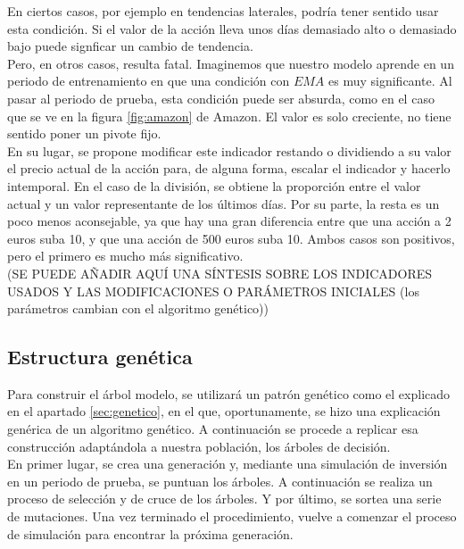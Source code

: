 En ciertos casos, por ejemplo en tendencias laterales, podr\'ia tener sentido usar esta condici\'on. Si el valor de la acci\'on lleva unos d\'ias demasiado alto o demasiado bajo puede signficar un cambio de tendencia.\\

Pero, en otros casos, resulta fatal. Imaginemos que nuestro modelo aprende en un periodo de entrenamiento en que una condici\'on con $EMA$ es muy significante. Al pasar al periodo de prueba, esta condici\'on puede ser absurda, como en el caso que se ve en la figura \ref{fig:amazon} de Amazon. El valor es solo creciente, no tiene sentido poner un pivote fijo.\\

En su lugar, se propone modificar este indicador restando o dividiendo a su valor el precio actual de la acci\'on para, de alguna forma, escalar el indicador y hacerlo intemporal. En el caso de la divisi\'on, se obtiene la proporci\'on entre el valor actual y un valor representante de los \'ultimos d\'ias. Por su parte, la resta es un poco menos aconsejable, ya que hay una gran diferencia entre que una acci\'on a 2 euros suba 10, y que una acci\'on de 500 euros suba 10. Ambos casos son positivos, pero el primero es mucho m\'as significativo. \\



(SE PUEDE A\~NADIR AQU\'I UNA S\'INTESIS SOBRE LOS INDICADORES USADOS Y LAS MODIFICACIONES O PAR\'AMETROS INICIALES (los par\'ametros cambian con el algoritmo genético))

\subsection{Estructura gen\'etica}
Para construir el \'arbol modelo, se utilizar\'a un patr\'on gen\'etico como el explicado en el apartado \ref{sec:genetico}, en el que, oportunamente, se hizo una explicaci\'on gen\'erica de un algoritmo gen\'etico. A continuaci\'on se procede a replicar esa construcci\'on adapt\'andola a nuestra poblaci\'on, los \'arboles de decisi\'on.\\

En primer lugar, se crea una generaci\'on y, mediante una simulaci\'on de inversi\'on en un periodo de prueba, se puntuan los \'arboles. A continuaci\'on se realiza un proceso de selecci\'on y de cruce de los \'arboles. Y por \'ultimo, se sortea una serie de mutaciones. Una vez terminado el procedimiento, vuelve a comenzar el proceso de simulaci\'on para encontrar la pr\'oxima generaci\'on.\\

